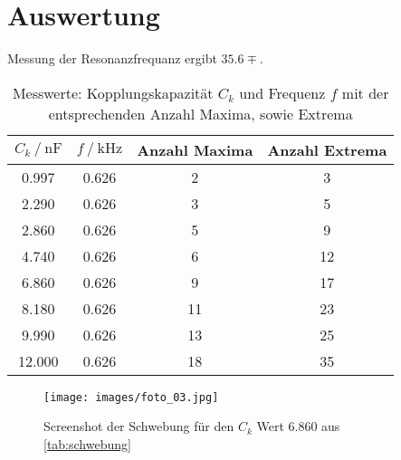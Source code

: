 \section{Auswertung}
\label{sec:Auswertung}




Messung der Resonanzfrequanz ergibt
    $35.6\mp$.

\begin{table}
  \centering
  \caption{Messwerte: Kopplungskapazität $C_k $ und Frequenz $f$ mit der entsprechenden Anzahl Maxima, sowie Extrema}
  \label{tab:schwebung}
  \begin{tabular}{c c c c}
    \toprule 
    $C_k \:/\: \si{\nano\farad}$ & $f \:/\: \si{\kilo\hertz}$ & Anzahl Maxima &  Anzahl Extrema   \\ 
    \midrule 
    0.997 & 0.626 & 2 & 3 \\
    2.290 & 0.626 & 3 & 5 \\
    2.860 & 0.626 & 5 & 9 \\
    4.740 & 0.626 & 6 & 12 \\
    6.860 & 0.626 & 9 & 17 \\
    8.180 & 0.626 & 11 & 23 \\
    9.990 & 0.626 & 13 & 25 \\
    12.000 & 0.626 & 18 & 35 \\
    \bottomrule
  \end{tabular}
\end{table}

\begin{figure}
  \centering
  \texttt{[image: images/foto\_03.jpg]}
  \caption{Screenshot der Schwebung für den $C_k$ Wert $6.860$ aus \autoref{tab:schwebung}}
\end{figure}


